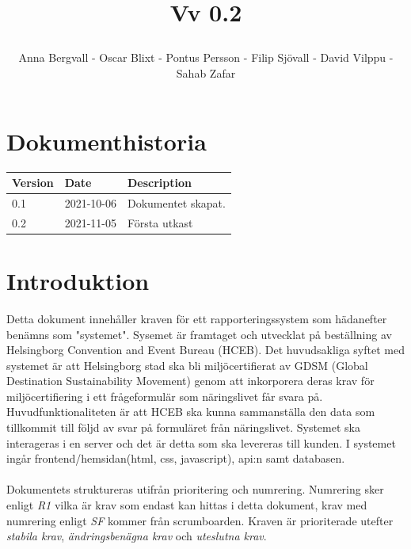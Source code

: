 \documentclass{article}
\date {#1}
\title {
    \documentNumber {01}    

    \documentTitle {Helsingborg Event and Convention Bureau}
    
    \documentDate {2021-08-20}
    \documentVersion Vv 0.2
    
    \author{Anna Bergvall - Oscar Blixt - Pontus Persson - Filip Sjövall - David Vilppu - Sahab Zafar}
}
\begin{document}
\maketitle

\thispagestyle{empty}



\newpage

\tableofcontents


\newpage

\section{Dokumenthistoria}
\begin{tabular}{ l | l | l }
    Version & Date & Description \\
    \hline
    0.1 & 2021-10-06 & Dokumentet skapat. \\
    0.2 & 2021-11-05 & Första utkast\\
    
\end{tabular}

\section{Introduktion}

    Detta dokument innehåller kraven för ett rapporteringssystem som hädanefter benämns som "systemet". Sysemet är framtaget och utvecklat på beställning av Helsingborg Convention and Event Bureau (HCEB). Det huvudsakliga syftet med systemet är att Helsingborg stad ska bli miljöcertifierat av GDSM (Global Destination Sustainability Movement) genom att inkorporera deras krav för miljöcertifiering i ett frågeformulär som näringslivet får svara på. Huvudfunktionaliteten är att HCEB ska kunna sammanställa den data som tillkommit till följd av svar på formuläret från näringslivet. Systemet ska interageras i en server och det är detta som ska levereras till kunden. I systemet ingår frontend/hemsidan(html, css, javascript), api:n samt databasen. 
    \\\\
    Dokumentets struktureras utifrån prioritering och numrering. Numrering sker enligt \textit{R1} vilka är krav som endast kan hittas i detta dokument, krav med numrering enligt \textit{SF} kommer från scrumboarden. Kraven är prioriterade utefter \textit{stabila krav}, \textit{ändringsbenägna krav} och \textit{uteslutna krav}. 
    
\end{document}
